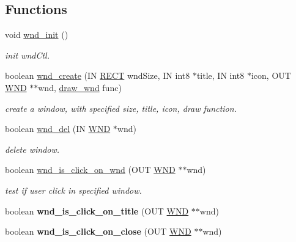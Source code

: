 \subsection*{Functions}
\begin{DoxyCompactItemize}
\item 
void \hyperlink{group__windows_gab9bb98f62625e12079469355edf0b885}{wnd\+\_\+init} ()
\begin{DoxyCompactList}\small\item\em init wnd\+Ctl. \end{DoxyCompactList}\item 
boolean \hyperlink{group__windows_gafaba4905e81021f08b9eafbd53336657}{wnd\+\_\+create} (I\+N \hyperlink{struct_r_e_c_t}{R\+E\+C\+T} wnd\+Size, I\+N int8 $\ast$title, I\+N int8 $\ast$icon, O\+U\+T \hyperlink{struct_w_n_d}{W\+N\+D} $\ast$$\ast$wnd, \hyperlink{group__windows_gac65b8e04920935e2abbadbc41b8bec92}{draw\+\_\+wnd} func)
\begin{DoxyCompactList}\small\item\em create a window, with specified size, title, icon, draw function. \end{DoxyCompactList}\item 
boolean \hyperlink{group__windows_ga64032548942cae1432a56d606d424095}{wnd\+\_\+del} (I\+N \hyperlink{struct_w_n_d}{W\+N\+D} $\ast$wnd)
\begin{DoxyCompactList}\small\item\em delete window. \end{DoxyCompactList}\item 
boolean \hyperlink{group__windows_gaf7ffbd5bbf997941897721876e2bc01a}{wnd\+\_\+is\+\_\+click\+\_\+on\+\_\+wnd} (O\+U\+T \hyperlink{struct_w_n_d}{W\+N\+D} $\ast$$\ast$wnd)
\begin{DoxyCompactList}\small\item\em test if user click in specified window. \end{DoxyCompactList}\item 
\hypertarget{group__windows_ga5e9842d8ea10a72c86cc78e1724d3c6d}{}boolean {\bfseries wnd\+\_\+is\+\_\+click\+\_\+on\+\_\+title} (O\+U\+T \hyperlink{struct_w_n_d}{W\+N\+D} $\ast$$\ast$wnd)\label{group__windows_ga5e9842d8ea10a72c86cc78e1724d3c6d}

\item 
\hypertarget{group__windows_ga67602b72aa224b56bbf8154d4a8bf5e2}{}boolean {\bfseries wnd\+\_\+is\+\_\+click\+\_\+on\+\_\+close} (O\+U\+T \hyperlink{struct_w_n_d}{W\+N\+D} $\ast$$\ast$wnd)\label{group__windows_ga67602b72aa224b56bbf8154d4a8bf5e2}


\end{DoxyCompactItemize}

